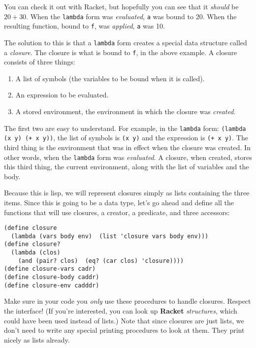 \documentclass{article}
\begin{document}
You can check it out with Racket,
but hopefully you can see that it {\em should} be $20 + 30$.  When the
{\tt lambda} form was {\em evaluated}, {\tt a} was bound to 20.  When
the resulting function, bound to {\tt f}, was {\em applied}, {\tt a}
was 10.

The solution to this is that a {\tt lambda} form creates a special
data structure called a {\em  closure}.  The closure is what is bound
to {\tt f}, in the above example.
A closure consists of three things:
\begin{enumerate}
\item A list of symbols (the variables to be bound when it is called).
\item An expression to be evaluated.
\item A stored environment, the environment in which the closure was
  {\em created}.
\end{enumerate}
The first two are easy to understand.  For example, in the {\tt lambda}
form: {\tt (lambda (x y) (+ x y))}, the list of symbols is {\tt (x y)}
and the expression is {\tt (+ x y)}.  The third thing is 
the environment that was in effect when the closure was created.  In
other words, when the {\tt lambda} form was {\em evaluated}.  A
closure, when created,
stores this third thing, the current environment,
along with the list of variables
and the body.

Because this is lisp, we will represent closures simply
as lists containing the
three items.  Since this is going to be a data type,
let's go ahead and define all the functions that will use
closures, a creator, a predicate, and three accessors:
\begin{Verbatim}[frame=single,label=Closure Data Type]
(define closure
  (lambda (vars body env)  (list 'closure vars body env)))
(define closure?
  (lambda (clos)
    (and (pair? clos)  (eq? (car clos) 'closure))))
(define closure-vars cadr)
(define closure-body caddr)
(define closure-env cadddr)  
\end{Verbatim}
Make sure in your code you {\em only} use these procedures to
handle closures.  Respect the interface!
(If you're interested, you can look up {\bf Racket} {\em structures},
which could have been used instead of lists.)
Note that since closures are just lists, we don't need to write any
special printing procedures to look at them.  They print nicely as
lists already.
\end{document}
